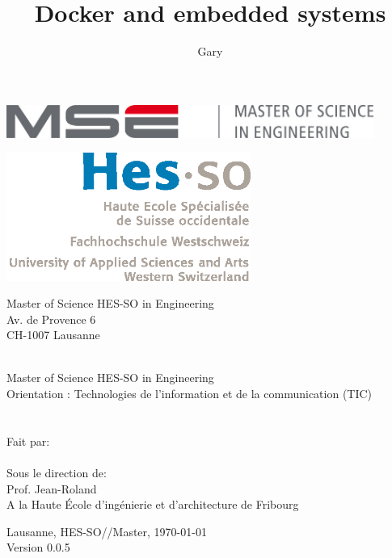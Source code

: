 \documentclass[11pt,a4paper,oneside]{report}
\title{Docker and embedded systems}
\author{Gary \bsc{Marigliano}}
\newcommand{\school}{Haute École d'ingénierie et d'architecture de Fribourg}
\newcommand{\version}{0.0.5}
\begin{document}
\begin{titlepage}
\selectfont
\begin{flushright}
\begin{minipage}{0.5\textwidth}
\begin{flushleft}
\includegraphics[width=0.9\textwidth]{./img/mse_logo}
\end{flushleft}
\end{minipage}%
\begin{minipage}{0.5\textwidth}
\begin{flushright}
\includegraphics[width=0.6\textwidth]{./img/logo_hes-so}
\end{flushright}
\end{minipage}
\begin{flushleft}
\footnotesize
Master of Science HES-SO in Engineering \\
Av. de Provence 6 \\
CH-1007 Lausanne
\end{flushleft}
~\\[0.5cm]

\Huge Master of Science HES-SO in Engineering\\[0.5cm]

\LARGE Orientation : Technologies de l’information et de la communication (TIC)\\[0.5cm]
~\\[1cm]
{
\Huge \MakeUppercase{\thetitle} \\[2.5cm]
}
{
\normalsize
Fait par:\\
\Huge \theauthor \\[0.5cm]
}
{
\normalsize
Sous le direction de: \\
Prof. Jean-Roland  \\
A la \school
}
\vfill

{\normalsize Lausanne, HES-SO//Master, \today \\
Version \version}

\end{flushright}
\end{titlepage}
\end{document}
